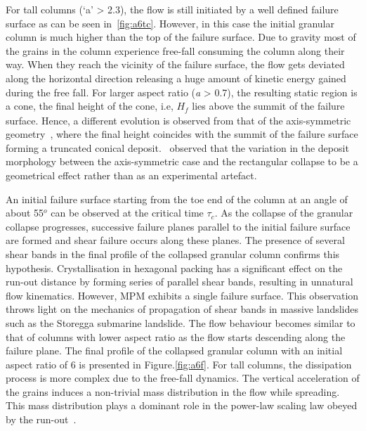 For tall columns (`a' > 2.3), the flow is still initiated by a well defined 
failure surface as can be seen in~\cref{fig:a6tc}. However, in this case the 
initial granular column is much higher than the top of the failure surface. Due 
to gravity most of the grains in the column experience free-fall 
consuming the column along their way. When they reach the vicinity of the 
failure surface, the flow gets deviated along the horizontal direction 
releasing a huge amount of kinetic energy gained during the free fall. For 
larger aspect ratio (\textit{a} > 0.7), the resulting static region is a cone, 
the final height of the cone, i.e, $\textit{H}_{\textit{f}}$ lies above the 
summit of the failure surface. Hence, a different evolution is observed from 
that of the axis-symmetric geometry~\citep{Lube2005}, where the final height 
coincides with the summit of the failure surface forming a truncated conical 
deposit.~\citet{Lajeunesse2004} observed that the variation in the deposit 
morphology between the axis-symmetric case and the rectangular collapse to be a 
geometrical effect rather than as an experimental artefact. 

An initial failure surface starting from the toe end 
of the column at an angle of about 55$^{o}$ can be observed at the critical 
time $\tau_{c}$. As the collapse of the granular collapse progresses, 
successive failure planes parallel to the initial failure surface are formed 
and shear failure occurs along these planes. The presence of several shear 
bands in the final profile of the collapsed granular column confirms this 
hypothesis. Crystallisation in hexagonal packing has a significant effect on 
the run-out distance by forming series of parallel shear bands, resulting in 
unnatural flow kinematics. However, MPM exhibits a single failure surface. This 
observation throws light on 
the mechanics of propagation of shear bands in massive landslides such as the 
Storegga submarine landslide. The flow behaviour becomes similar to that of 
columns with lower aspect ratio as the flow starts descending along the failure 
plane. The final profile of the collapsed granular column with an initial 
aspect ratio of 6 is presented in Figure.\ref{fig:a6f}. For tall columns, the 
dissipation process is more complex due to the free-fall dynamics. The vertical 
acceleration of the grains induces a non-trivial mass distribution in the flow 
while spreading. This mass distribution plays a dominant role in the power-law 
scaling law obeyed by the run-out~\citep{Staron2006a}.


